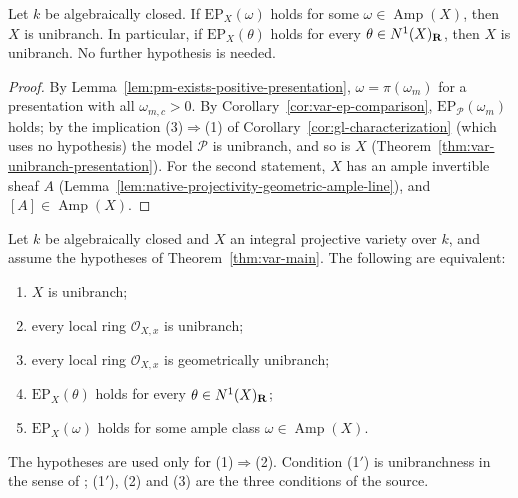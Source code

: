 \begin{theorem}
\label{thm:var-unibranch-of-ep}
\leanok
{}
Let $k$ be algebraically closed. If $\mathrm{EP}_X(\omega)$ holds for some
$\omega\in\operatorname{Amp}(X)$, then $X$ is unibranch. In particular, if
$\mathrm{EP}_X(\theta)$ holds for every $\theta\in N^1(X)_{\mathbf{R}}$, then $X$ is unibranch. No
further hypothesis is needed.
\end{theorem}

\begin{proof}
By Lemma~\ref{lem:pm-exists-positive-presentation}, $\omega=\pi(\omega_m)$ for a presentation
with all $\omega_{m,c}>0$. By Corollary~\ref{cor:var-ep-comparison},
$\mathrm{EP}_{\mathcal P}(\omega_m)$ holds; by the implication (3)$\Rightarrow$(1) of
Corollary~\ref{cor:gl-characterization} (which uses no hypothesis) the model $\mathcal P$ is
unibranch, and so is $X$ (Theorem~\ref{thm:var-unibranch-presentation}). For the second
statement, $X$ has an ample invertible sheaf $A$
(Lemma~\ref{lem:native-projectivity-geometric-ample-line}), and $[A]\in\operatorname{Amp}(X)$.
\end{proof}

\begin{corollary}
\label{cor:var-characterization}
\leanok
{}
Let $k$ be algebraically closed and $X$ an integral projective variety over $k$, and assume the
hypotheses of Theorem~\ref{thm:var-main}. The following are equivalent:
\begin{enumerate}
\item $X$ is unibranch;
\item[(1$'$)] every local ring $\mathcal O_{X,x}$ is unibranch;
\item[(1$''$)] every local ring $\mathcal O_{X,x}$ is geometrically unibranch;
\item[(2)] $\mathrm{EP}_X(\theta)$ holds for every $\theta\in N^1(X)_{\mathbf{R}}$;
\item[(3)] $\mathrm{EP}_X(\omega)$ holds for some ample class $\omega\in\operatorname{Amp}(X)$.
\end{enumerate}
The hypotheses are used only for (1)$\Rightarrow$(2). Condition (1$'$) is unibranchness in the
sense of \cite[\S1.1]{FHX}; (1$'$), (2) and (3) are the three conditions of the source.
\end{corollary}

